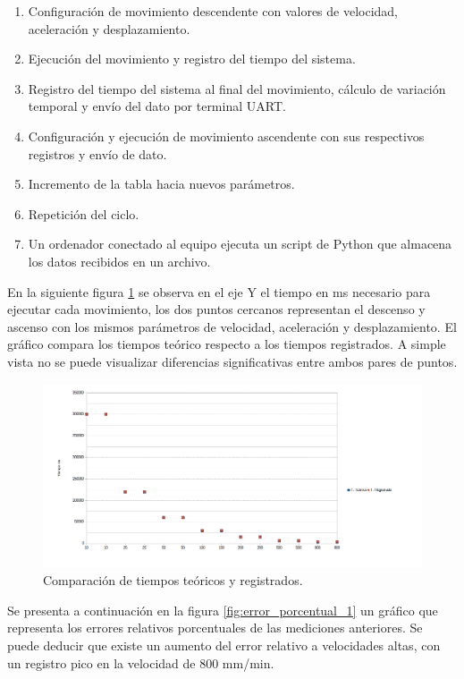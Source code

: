\begin{enumerate}
\item Configuración de movimiento descendente con valores de velocidad, aceleración y desplazamiento.
\item Ejecución del movimiento y registro del tiempo del sistema.
\item Registro del tiempo del sistema al final del movimiento, cálculo de variación temporal y envío del dato por terminal UART.
\item Configuración y ejecución de movimiento ascendente con sus respectivos registros y envío de dato.
\item Incremento de la tabla hacia nuevos parámetros.
\item Repetición del ciclo.
\item Un ordenador conectado al equipo ejecuta un script de Python que almacena los datos recibidos en un archivo.
\end{enumerate}

En la siguiente figura \ref{fig:tiempo_movimiento_1} se observa en el eje Y el tiempo en ms necesario para ejecutar cada movimiento, los dos puntos cercanos representan el descenso y ascenso con los mismos parámetros de velocidad, aceleración y desplazamiento. El gráfico compara los tiempos teórico respecto a los tiempos registrados. A simple vista no se puede visualizar diferencias significativas entre ambos pares de puntos.

\begin{figure}[h]
\centering 
\includegraphics[width=1.2\textwidth]{./Figures/tiempo_movimiento_1.png}
\caption{Comparación de tiempos teóricos y registrados.}
\label{fig:tiempo_movimiento_1}
\end{figure}

Se presenta a continuación en la figura \ref{fig:error_porcentual_1} un gráfico que representa los errores relativos porcentuales de las mediciones anteriores. Se puede deducir que existe un aumento del error relativo a velocidades altas, con un registro pico  en la velocidad de 800 mm/min. 


